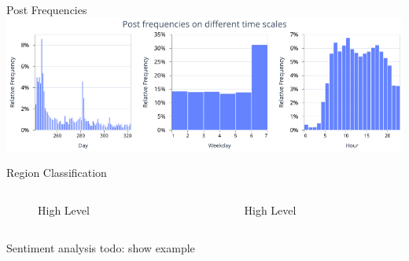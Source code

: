 \documentclass[usenames,dvipsnames,aspectratio=169]{beamer}
\begin{document}
	
	\begin{frame}{Post Frequencies}
		\includegraphics[width=\linewidth, keepaspectratio]{pictures/paper/sentiments/visualization_valid_posts_frequency.png}
	\end{frame}
	
	\begin{frame}{Region Classification}
		\begin{columns}
			
			\begin{column}{0.45\textwidth}
				\begin{tcolorbox}[colback=white, colframe=ElixirPurple, arc=3mm, boxrule=0mm, height=0.8\textheight, valign=center, title=Text Cleaning]
					\begin{figure}[htbp]
						\centering
						\resizebox{\columnwidth}{!}{}
						\caption{High Level}
					\end{figure}
				\end{tcolorbox}
			\end{column}
			
			\begin{column}{0.45\textwidth}
				\begin{tcolorbox}[colback=white, colframe=ElixirPurple, arc=3mm, boxrule=0mm, height=0.8\textheight, valign=center, title=Post Selection]
					
					\begin{figure}[htbp]
						\centering
						\resizebox{\columnwidth}{!}{}
						\caption{High Level}
					\end{figure}
				\end{tcolorbox}
			\end{column}
		\end{columns}
	\end{frame}
	
	
\begin{frame}{Sentiment analysis}
	todo: show example
\end{frame}
	
\end{document}
